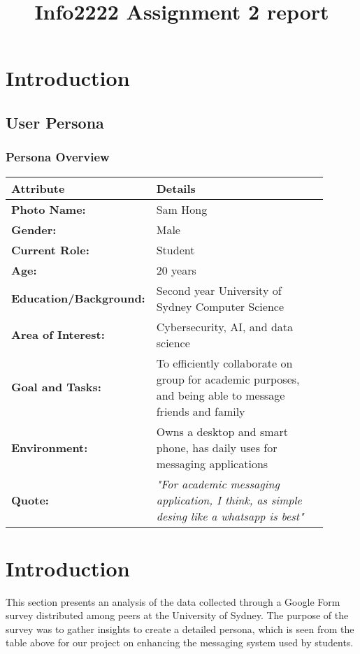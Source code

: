 \documentclass[12pt,a4paper]{article}
\title{Info2222 Assignment 2 report}
\date{}
\begin{document}
\maketitle

\section{Introduction}

\subsection{User Persona}
\subsubsection*{Persona Overview}

\noindent
\begin{tabular}{|p{0.3\linewidth}|p{0.6\linewidth}|}
\hline
\textbf{Attribute} & \textbf{Details} \\
\hline
\textbf{Photo Name:} & Sam Hong \\
\hline
\textbf{Gender:} & Male \\
\hline
\textbf{Current Role:} & Student \\
\hline
\textbf{Age:} & 20 years \\
\hline
\textbf{Education/Background:} & Second year University of Sydney Computer Science \\
\hline
\textbf{Area of Interest:} & Cybersecurity, AI, and data science \\
\hline
\textbf{Goal and Tasks:} & To efficiently collaborate on group for academic purposes, and being able to message friends and family \\
\hline
\textbf{Environment:} & Owns a desktop and smart phone, has daily uses for messaging applications \\
\hline
\textbf{Quote:} & \textit{"For academic messaging application, I think, as simple desing like a whatsapp is best"} \\
\hline
\end{tabular}

\section{Introduction}
This section presents an analysis of the data collected through a Google Form survey distributed among peers at the University of Sydney. The purpose of the survey was to gather insights to create a detailed persona, which is seen from the table above for our project on enhancing the messaging system used by students.
\end{document}
